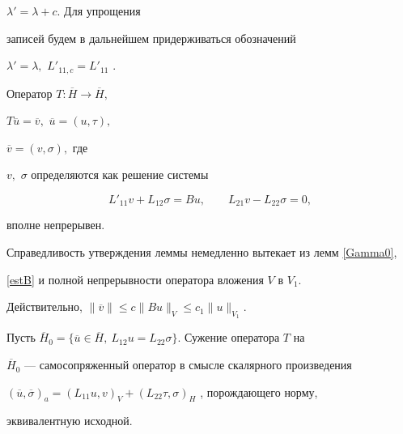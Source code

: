 $\lambda ' = \lambda + c $. Для упрощения


записей будем в дальнейшем придерживаться обозначений


$ \lambda ' = \lambda,$ $ L'_{11,c} = L'_{11} $ .





\begin{lem}


Оператор $ T: \overline H \to \overline H ,$ 


$T \overline u = \overline v,$ $\overline u = (u, \tau),$


$\overline v = (v, \sigma ),$ где 


$ v,$ $\sigma $ определяются как решение системы


\begin{equation}


\label{Tdef1}


L'_{11}v + L_{12} \sigma = Bu, \qquad


L_{21} v - L_{22} \sigma = 0,


\end{equation}


вполне непрерывен.


\end{lem}





Справедливость утверждения леммы немедленно вытекает из лемм \ref{Gamma0},


\ref{estB} и полной непрерывности оператора вложения $V$ в $V_1$.


Действительно, $\| \overline v \| \le c \|Bu \|_V \le c_1 \|u \|_{V_1}. $


\begin{lem}


Пусть $ \overline H_0 = \{ \overline u \in \overline H, \


L_{12}u = L_{22} \sigma \}.$ Сужение оператора $T$ на


$ \overline H_0$ --- самосопряженный оператор в смысле скалярного произведения


$(\overline u, \overline \sigma )_a =


(L_{11}u,v)_V + (L_{22} \tau, \sigma )_H $ , порождающего норму,


эквивалентную исходной.


\end{lem}





